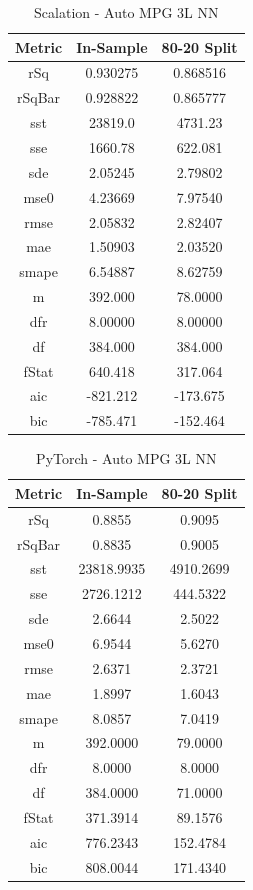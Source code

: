 \documentclass{article}
\begin{document}
\begin{table}[H]
\centering
\caption{Scalation - Auto MPG 3L NN}
\label{tab:Scalation - Auto MPG 3L NN}
\begin{tabular}{|c|c|c|} \hline 
Metric & In-Sample & 80-20 Split \\ \hline \hline 
rSq &0.930275 & 0.868516 \\ \hline 
rSqBar &0.928822 &      0.865777 \\ \hline 
sst &23819.0 &  4731.23 \\ \hline 
sse &1660.78 &  622.081 \\ \hline 
sde &2.05245 &  2.79802 \\ \hline 
mse0 &4.23669 & 7.97540 \\ \hline 
rmse &2.05832 & 2.82407 \\ \hline 
mae &1.50903 &  2.03520 \\ \hline 
smape &6.54887 &        8.62759 \\ \hline 
m &392.000 &    78.0000 \\ \hline 
dfr &8.00000 &  8.00000 \\ \hline 
df &384.000 &   384.000 \\ \hline 
fStat &640.418 &        317.064 \\ \hline 
aic &-821.212 & -173.675 \\ \hline 
bic &-785.471 & -152.464 \\ \hline 
\end{tabular}
\end{table}

\begin{table}[H]
\centering
\caption{PyTorch - Auto MPG 3L NN}
\label{tab:PyTorch - Auto MPG 3L NN}
\begin{tabular}{|c|c|c|}\hline
Metric & In-Sample & 80-20 Split \\ \hline \hline
rSq & 0.8855 & 0.9095 \\ \hline
rSqBar & 0.8835 & 0.9005 \\ \hline
sst & 23818.9935 & 4910.2699 \\ \hline
sse & 2726.1212 & 444.5322 \\ \hline
sde & 2.6644 & 2.5022 \\ \hline
mse0 & 6.9544 & 5.6270 \\ \hline
rmse & 2.6371 & 2.3721 \\ \hline
mae & 1.8997 & 1.6043 \\ \hline
smape & 8.0857 & 7.0419 \\ \hline
m & 392.0000 & 79.0000 \\ \hline
dfr & 8.0000 & 8.0000 \\ \hline
df & 384.0000 & 71.0000 \\ \hline
fStat & 371.3914 & 89.1576 \\ \hline
aic & 776.2343 & 152.4784 \\ \hline
bic & 808.0044 & 171.4340 \\ \hline
\end{tabular}
\end{table}
\end{document}
